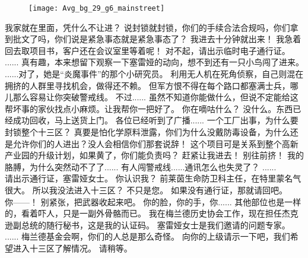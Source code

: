 \documentclass[openany]{book}
\begin{document}
\begin{figure}[h]
    \centering
    \texttt{[image: Avg\_bg\_29\_g6\_mainstreet]}
\end{figure}
\begin{dialogue}
     我家就在里面，凭什么不让进？
     说封锁就封锁，你们的手续合法合规吗，你们拿到批文了吗，你们说是紧急事态就是紧急事态了？
     我进去十分钟就出来！
     我急着回去取项目书，客户还在会议室里等着呢！
     对不起，请出示临时电子通行证。
     ......
     真有趣，本来想留下观察一下塞雷娅的动向，想不到还有一只小鸟闯了进来。
     ......对了，她是“炎魔事件”的那个小研究员。
     利用无人机在死角侦察，自己则混在拥挤的人群里寻找机会，做得还不赖。
     但军方恨不得在每个路口都塞满士兵，哪儿那么容易让你突破警戒线。
     不过......
     虽然不知道你能做什么，但说不定能给这帮坏事的家伙找点小麻烦。让我帮你一把好了。
     你在嘀咕什么？
     没什么。东西已经成功回收，马上送货上门。
     各位已经听到了广播......
     一个工厂出事，为什么要封锁整个十三区？
     真要是怕化学原料泄露，你们为什么没戴防毒设备，为什么还是允许你们的人进出？没人会相信你们那套说辞！
     这个项目可是关系到整个高新产业园的升级计划，如果黄了，你们能负责吗？
     赶紧让我进去！
     别往前挤！
     我的胳膊，为什么突然动不了了......
     有人闯警戒线......通讯怎么也失灵了？
     ......
    \\
     请出示通行证，塞雷娅女士。
     你认识我？
     前莱茵生命防卫科主任，在特里蒙名气很大。
     所以我没法进入十三区？
     不只是您。
     如果没有通行证，那就请回吧。
    \\
     你——！
     别紧张，把武器收起来吧。
     你的脸，你的手，你......
     其他部位也是一样的，看着吓人，只是一副外骨骼而已。
     我在梅兰德历史协会工作，现在担任杰克逊副总统的随行秘书，这是我的认证码。
     塞雷娅女士是我们邀请的问题专家。
     ......
     梅兰德基金会啊，你们的人总是那么奇怪。
     向你的上级请示一下吧，我们希望进入十三区了解情况。
     请稍等。

\end{dialogue}
\end{document}
